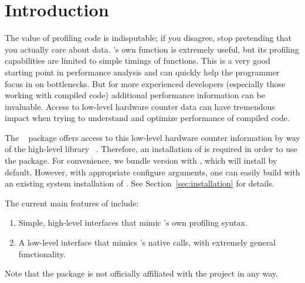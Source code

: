 \section{Introduction}
\label{sec:introduction}

The value of profiling code is indisputable; if you disagree, stop pretending  
that you actually care about data.  \R's own  function is 
extremely useful, but its profiling capabilities are limited to simple timings 
of \R functions. This is a very good starting point in performance analysis and 
can quickly help the \R programmer focus in on bottlenecks.  But for more 
experienced developers (especially those working with compiled code) additional 
performance information can be invaluable. Access to low-level hardware counter 
data can have tremendous impact when trying to understand and optimize 
performance of compiled code. 

The \thispackage~\citep{Schmidt2014pbdPAPIpackage} package offers access to  
this low-level hardware counter information by way of the high-level \C library 
\PAPI~\citep{mucci1999papi}.  Therefore, an installation of \PAPI is required in 
order to use the package.  For convenience, we bundle \PAPI version \PAPIversion 
with \thispackage, which will install by default.  However, with appropriate 
configure arguments, one can easily build \thispackage with an existing system 
installation of \PAPI.  See Section~\ref{sec:installation} for details.

The current main features of \thispackage include:
\begin{enumerate}
  \item Simple, high-level interfaces that mimic \R's own profiling syntax.
  \item A low-level interface that mimics \PAPI's native calls, with  extremely 
  general functionality.
\end{enumerate}

Note that the  package is not officially affiliated with the 
 project in any way.